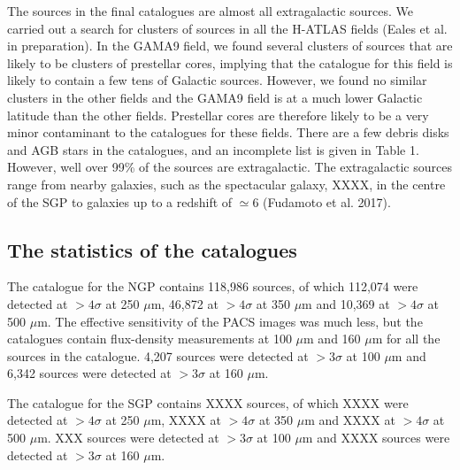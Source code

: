 \documentclass[useAMS,usenatbib]{mn2e}
\begin{document}
The sources in the final catalogues are almost all extragalactic sources. We carried out
a search for clusters of sources in all the H-ATLAS fields (Eales et al. in preparation).
In the GAMA9 field, we found several clusters of sources that are likely to
be clusters of prestellar cores, implying 
that the catalogue for this field
is likely to contain a few tens of Galactic sources.
However, we found no similar clusters in the other fields and the
GAMA9 field is at a much lower Galactic latitude than the other
fields. Prestellar cores are therefore likely to be a very minor contaminant to the
catalogues for these fields. There are a few debris disks and AGB stars
in the catalogues, 
and an incomplete list is given in Table 1.
However, well over 99\% of the sources are extragalactic. The extragalactic
sources range from nearby galaxies, such as the spectacular galaxy, XXXX,
in the centre of the SGP to galaxies up to a redshift of $\simeq$6 (Fudamoto
et al. 2017).

\subsection{The statistics of the catalogues}

The catalogue for the NGP contains 118,986 sources, of which 112,074 were detected
at $>4\sigma$ at 250 $\mu$m, 46,872 at $>4\sigma$ at 350 $\mu$m and 10,369 at
$>4\sigma$ at 500 $\mu$m. The effective sensitivity of the PACS images was
much less, but the catalogues contain flux-density measurements at 100 $\mu$m and
160 $\mu$m for all the sources in the catalogue. 4,207  sources were detected
at $>3\sigma$ at 100 $\mu$m and 6,342 sources were detected at 
$>3\sigma$ at 160 $\mu$m.

The catalogue for the SGP contains XXXX sources, of which XXXX  were detected
at $>4\sigma$ at 250 $\mu$m, XXXX at $>4\sigma$ at 350 $\mu$m and XXXX  at
$>4\sigma$ at 500 $\mu$m. 
XXX sources were detected
at $>3\sigma$ at 100 $\mu$m and XXXX sources were detected at 
$>3\sigma$ at 160 $\mu$m.
\end{document}
